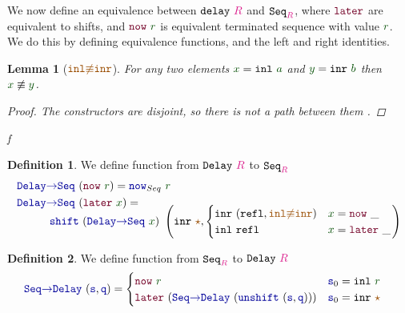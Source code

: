 \documentclass[twoside,11pt,openright]{report}
\theoremstyle{plain} %
\newtheorem{lem}[thm]{Lemma}
\theoremstyle{definition}
\newtheorem{defn}{Definition}[section]
\theoremstyle{remark}
\newcommand*{\term}[1]{\textcolor{green!30!black}{#1}} %
\newcommand*{\type}[1]{\textcolor{magenta!90!black}{#1}}
\newcommand*{\constant}[1]{\textcolor{orange!60!black}{\ensuremath{\mathtt{#1}}}}
\newcommand*{\function}[1]{\textcolor{blue!60!black}{\ensuremath{\mathtt{#1}}}}
\newcommand*{\constructor}[1]{\textcolor{purple!60!black}{\ensuremath{\mathtt{#1}}}}
\newcommand*{\typeformer}[1]{\ensuremath{\mathtt{#1}}}
\newcommand*{\unitelem}{\constant{\star}} %
\begin{document}
\noindent We now define an equivalence between \(\typeformer{delay}~\type{R}\) and \(\typeformer{Seq}_{\type{R}}\), where \(\constructor{later}\) are equivalent to shifts, and \(\constructor{now}~\term{r}\) is equivalent terminated sequence with value \(\term{r}\). We do this by defining equivalence functions, and the left and right identities.
\begin{lem}[\(\constant{inl{\not\equiv}inr}\)]
  For any two elements \(\term{x} = \mathtt{inl}~\term{a}\) and \(\term{y} = \mathtt{inr}~\term{b}\) then \(\term{x} \not\equiv \term{y}\).
  \begin{proof}
    The constructors are disjoint, so there is not a path between them .
  \end{proof}
f\end{lem}
\begin{defn}
  We define function from \(\typeformer{Delay}~\type{R}\) to \(\typeformer{Seq}_{\type{R}}\)
  \begin{equation}
    \begin{aligned}
      \function{Delay{\rightarrow}Seq}&~(\constructor{now}~\term{r}) = \function{now}_{Seq}~\term{r} \\
      \function{Delay{\rightarrow}Seq}&~(\constructor{later}~\term{x}) = \\[-3mm]
      & \strut\hspace{-8mm}\function{shift}~(\function{Delay{\rightarrow}Seq}~\term{x})~\left(\mathtt{inr}~\unitelem , \begin{cases} \mathtt{inr}~(\mathtt{refl} , \constant{inl{\not\equiv}inr}) & \term{x} = \constructor{now}~\_ \\ \mathtt{inl}~\mathtt{refl} & \term{x} = \constructor{later}~\_ \end{cases}\right)
    \end{aligned}
  \end{equation}
\end{defn}
\begin{defn}
  We define function from \(\typeformer{Seq}_{\type{R}}\) to \(\typeformer{Delay}~\type{R}\)
    \begin{equation}
      \begin{aligned}
        \function{Seq{\rightarrow}Delay}&~(\function{s} , \function{q}) = \begin{cases} \constructor{now}~\term{r} & \function{s}_0 = \mathtt{inl}~\term{r} \\ \constructor{later}~(\function{Seq{\rightarrow}Delay}~(\function{unshift}~(\function{s} , \function{q}))) & \function{s}_0 = \mathtt{inr}~\unitelem \end{cases}
      \end{aligned}
    \end{equation}
\end{defn}
\end{document}
